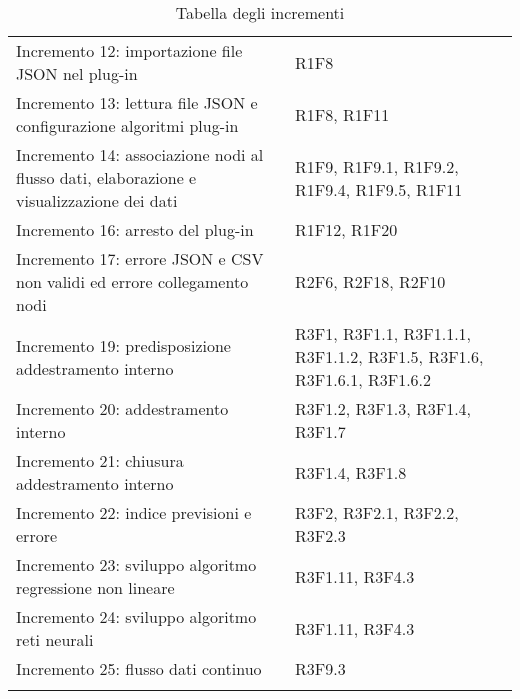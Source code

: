 \begin{longtable} {
		>{\raggedright\arraybackslash}p{85mm}
		>{\raggedleft\arraybackslash}p{40mm}
	}
	Incremento 12: importazione file JSON nel plug-in &
	R1F8 \TBstrut \\ [2mm]
	
	Incremento 13: lettura file JSON e configurazione algoritmi plug-in &
	R1F8, R1F11 \TBstrut \\ [2mm]
	
	Incremento 14: associazione nodi al flusso dati, elaborazione e visualizzazione dei dati &
	R1F9, R1F9.1, R1F9.2, R1F9.4, R1F9.5, R1F11 \TBstrut \\ [2mm]
	
	Incremento 16: arresto del plug-in &
	R1F12, R1F20 \TBstrut \\ [2mm]
	
	Incremento 17: errore JSON e CSV non validi ed errore collegamento nodi &
	R2F6, R2F18, R2F10 \TBstrut \\ [2mm]
	
	Incremento 19: predisposizione addestramento interno &
	R3F1, R3F1.1, R3F1.1.1, R3F1.1.2, R3F1.5, R3F1.6, R3F1.6.1, R3F1.6.2 \TBstrut \\ [2mm]
	
	Incremento 20: addestramento interno &
	R3F1.2, R3F1.3, R3F1.4, R3F1.7 \TBstrut \\ [2mm]
	
	Incremento 21: chiusura addestramento interno &
	R3F1.4, R3F1.8 \TBstrut \\ [2mm]
	
	Incremento 22: indice previsioni e errore &
	R3F2, R3F2.1, R3F2.2, R3F2.3 \TBstrut \\ [2mm]
	
	Incremento 23: sviluppo algoritmo regressione non lineare &
	R3F1.11, R3F4.3 \TBstrut \\ [2mm]
	
	Incremento 24: sviluppo algoritmo reti neurali\glo &
	R3F1.11, R3F4.3 \TBstrut \\ [2mm]
	
	Incremento 25: flusso dati continuo &
	R3F9.3 \TBstrut \\ [2mm]
	\rowcolor{white}
	\caption{Tabella degli incrementi}
\end{longtable}

